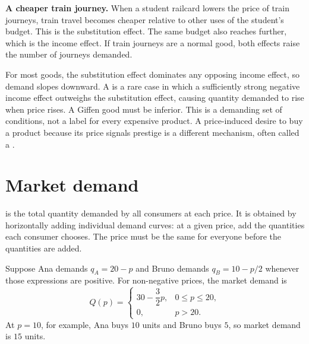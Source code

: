\begin{exercisebox}
\textbf{A cheaper train journey.}
When a student railcard lowers the price of train journeys, train travel
becomes cheaper relative to other uses of the student's budget. This is the
substitution effect. The same budget also reaches further, which is the income
effect. If train journeys are a normal good, both effects raise the number of
journeys demanded.
\end{exercisebox}

For most goods, the substitution effect dominates any opposing income effect,
so demand slopes downward. A  is a rare case in which a
sufficiently strong negative income effect outweighs the substitution effect,
causing quantity demanded to rise when price rises. A Giffen good must be
inferior. This is a demanding set of conditions, not a label for every
expensive product. A price-induced desire to buy a product because its price
signals prestige is a different mechanism, often called a .

\section{Market demand}

 is the total quantity demanded by all consumers at
each price. It is obtained by horizontally adding individual demand curves:
at a given price, add the quantities each consumer chooses. The price must be
the same for everyone before the quantities are added.

Suppose Ana demands $q_A=20-p$ and Bruno demands $q_B=10-p/2$ whenever
those expressions are positive. For non-negative prices, the market demand is
\[
Q(p)=
\begin{cases}
30-\dfrac{3}{2}p, & 0\leq p\leq20,\\
0, & p>20.
\end{cases}
\]
At $p=10$, for example, Ana buys $10$ units and Bruno buys $5$, so market
demand is $15$ units.

